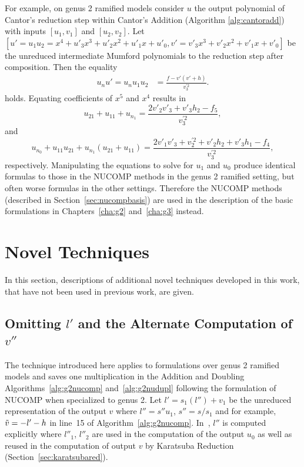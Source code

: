 For example, on genus 2 ramified models consider $u$ the output
polynomial of Cantor's reduction step within Cantor's Addition (Algorithm
\ref{alg:cantoradd}) with inputs $[u_1,v_1]$ and $[u_2,v_2]$. Let $[u' = u_1u_2
= x^4 + u'_3x^3 + u'_2x^2 + u'_1x + u'_0, v' = v'_3x^3 + v'_2x^2 + v'_1x +
v'_0]$ be the unreduced intermediate Mumford polynomials to the reduction step
after composition. Then the equality
\begin{align*} 
  u_nu' = u_nu_1u_2 &= \frac{f - v'(v' + h)}{v^{\prime 2}_3}.
\end{align*} holds. Equating coefficients of $x^5$ and $x^4$ results in 
$$u_{21} + u_{11} + u_{n_1} = \frac{2v'_2v'_3 + v'_3h_2 - f_5}{v^{\prime 2}_3},$$ and 
$$ u_{n_0} + u_{11}u_{21} + u_{n_1}(u_{21} + u_{11}) = \frac{2v'_1v'_3 +
v^{\prime 2}_2 + v'_2h_2 + v'_3h_1 - f_4}{v^{\prime 2}_3},$$ respectively.
Manipulating the equations to solve for $u_1$ and $u_0$ produce identical
formulas to those in the NUCOMP methods in the genus 2 ramified setting, but often worse
formulas in the other settings.  Therefore the NUCOMP methods (described in
Section~\ref{sec:nucompbasis}) are used in the description of the basic
formulations in Chapters~\ref{cha:g2} and~\ref{cha:g3} instead.



\section{Novel Techniques}
In this section, descriptions of additional novel techniques developed in this
work, that have not been used in previous work, are given.


\subsection{Omitting  \texorpdfstring{$l'$}{l'} and the Alternate Computation of  \texorpdfstring{$v''$}{v''}} 
\label{sec:vsave}
The technique introduced here applies to formulations over genus 2 ramified
models and saves one multiplication in the Addition and Doubling
Algorithms~\ref{alg:g2nucomp} and~\ref{alg:g2nudupl} following the formulation
of NUCOMP when specialized to genus 2. Let $l' = s_1(l'') + v_1$ be the
unreduced representation of the output $v$ where $l'' = s''u_1$, $s'' =s/s_1$ and for
example, $\tilde{v} = -l'-h$ in line~15 of Algorithm~\ref{alg:g2nucomp}.
In~\cite{Lange_explicit_2005}, $l''$ is computed explicitly where $l''_1$,
$l''_2$ are used in the computation of the output $u_0$ as well as reused in the
computation of output $v$ by Karatsuba Reduction
(Section~\ref{sec:karatsubared}). 

